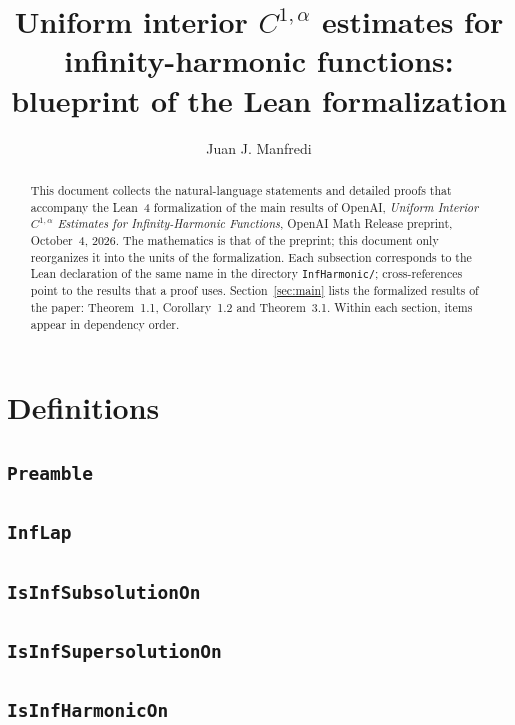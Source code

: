 \documentclass[11pt]{amsart}
\title[Blueprint of the Lean formalization]{Uniform interior $C^{1,\alpha}$ estimates for infinity-harmonic functions: blueprint of the Lean formalization}
\author{Juan J. Manfredi}
\theoremstyle{definition}
\begin{document}
\begin{abstract}
This document collects the natural-language statements and detailed proofs that accompany the Lean~4 formalization of the main results of OpenAI, \emph{Uniform Interior $C^{1,\alpha}$ Estimates for Infinity-Harmonic Functions}, OpenAI Math Release preprint, October~4, 2026.
The mathematics is that of the preprint; this document only reorganizes it into the units of the formalization.
Each subsection corresponds to the Lean declaration of the same name in the directory \texttt{InfHarmonic/}; cross-references point to the results that a proof uses.
Section~\ref{sec:main} lists the formalized results of the paper: Theorem~1.1, Corollary~1.2 and Theorem~3.1.
Within each section, items appear in dependency order.
\end{abstract}
\maketitle
\tableofcontents

\section{Definitions}
\subsection{\texorpdfstring{\texttt{Preamble}}{Preamble}}\label{node:Preamble}


\subsection{\texorpdfstring{\texttt{InfLap}}{InfLap}}\label{node:InfLap}


\subsection{\texorpdfstring{\texttt{IsInfSubsolutionOn}}{IsInfSubsolutionOn}}\label{node:IsInfSubsolutionOn}


\subsection{\texorpdfstring{\texttt{IsInfSupersolutionOn}}{IsInfSupersolutionOn}}\label{node:IsInfSupersolutionOn}


\subsection{\texorpdfstring{\texttt{IsInfHarmonicOn}}{IsInfHarmonicOn}}\label{node:IsInfHarmonicOn}

\end{document}
